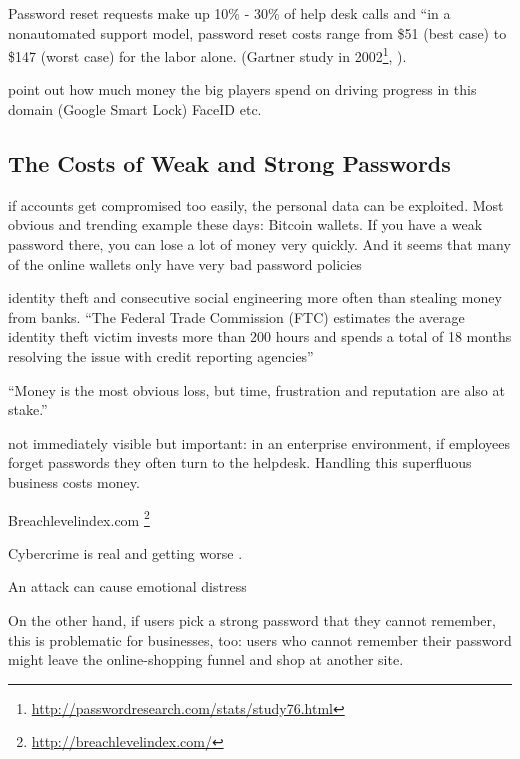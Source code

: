 Password reset requests make up 10\% - 30\% of help desk calls and ``in a nonautomated support model, password reset costs range from \$51 (best case) to \$147 (worst case) for the labor alone. (Gartner study in 2002\footnote{\url{http://passwordresearch.com/stats/study76.html}}, ).

point out how much money the big players spend on driving progress in this domain (Google Smart Lock) FaceID etc. 

\subsection{The Costs of Weak and Strong Passwords}

if accounts get compromised too easily, the personal data can be exploited. Most obvious and trending example these days: Bitcoin wallets. If you have a weak password there, you can lose a lot of money very quickly. And it seems that many of the online wallets only have very bad password policies

identity theft and consecutive social engineering more often than stealing money from banks. ``The Federal Trade Commission (FTC) estimates the average identity theft victim invests more than 200 hours and spends a total of 18 months resolving the issue with credit reporting agencies''

``Money is the most obvious loss, but time, frustration and reputation are also at stake.'' \cite{Herley2012PersistenceOfPasswords}



not immediately visible but important: in an enterprise environment, if employees forget passwords they often turn to the helpdesk. Handling this superfluous business costs money. 

Breachlevelindex.com \footnote{\label{foot:rw:breachlevelindex}\url{http://breachlevelindex.com/}}

Cybercrime is real and getting worse \cite{BKA2016Bundeslagebild}.

An attack can cause emotional distress \cite{Shay2014ReligiousAunt}

On the other hand, if users pick a strong password that they cannot remember, this is problematic for businesses, too: users who cannot remember their password might leave the online-shopping funnel and shop at another site.

